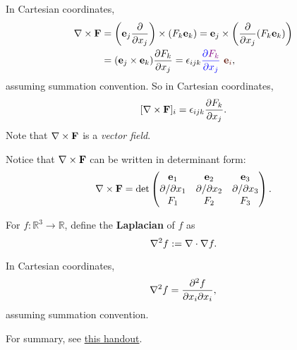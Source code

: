 \begin{note}
    In Cartesian coordinates, 
    \begin{align*}
        \curl \mathbf{F}&= \left( \mathbf{e}_j \frac{\partial }{\partial x_j} \right)\times (F_k\mathbf{e}_k)=\mathbf{e}_j \times \left( \frac{\partial }{\partial x_j}(F_k\mathbf{e}_k)  \right)\\ 
        &= (\mathbf{e}_j \times \mathbf{e}_k)\frac{\partial F_k}{\partial x_j} = \epsilon_{ijk} {\color{blue}\frac{\partial {\color{violet}F_k}}{\partial x_j}} \ {\color{Sepia}\mathbf{e}_i},
    \end{align*}
    assuming summation convention. So in Cartesian coordinates,
    \[
        [\nabla\times \mathbf{F}]_{i} = \epsilon_{ijk}\frac{\partial F_k}{\partial x_j}. 
    \]
    Note that $ \nabla\times \mathbf{F} $ is a \textit{vector field}.
\end{note}
Notice that $ \nabla\times \mathbf{F} $ can be written in determinant form:
\[
    \nabla\times \mathbf{F} = \det \begin{pmatrix}
        \mathbf{e}_1 & \mathbf{e}_2 & \mathbf{e}_3 \\
        \partial /\partial x_1  & \partial /\partial x_2  & \partial /\partial x_3  \\
        F_1 & F_2 & F_3 \\
    \end{pmatrix}.
\]

\begin{definition}[Laplacian]
    For $ f:\mathbb{R}^{3}\to \mathbb{R} $, define the \textbf{Laplacian} of $f$ as 
    \[
        \laplacian f:= \div \nabla f.
    \]
\end{definition}
\begin{note}
    In Cartesian coordinates, 
    \[
        \laplacian f = \frac{\partial ^2 f}{\partial x_i \partial x_i}, 
    \]
    assuming summation convention.
\end{note}

For summary, see \href{http://jt775.user.srcf.net/IA-Lent/handouts/vc_handout3.pdf}{this handout}.

